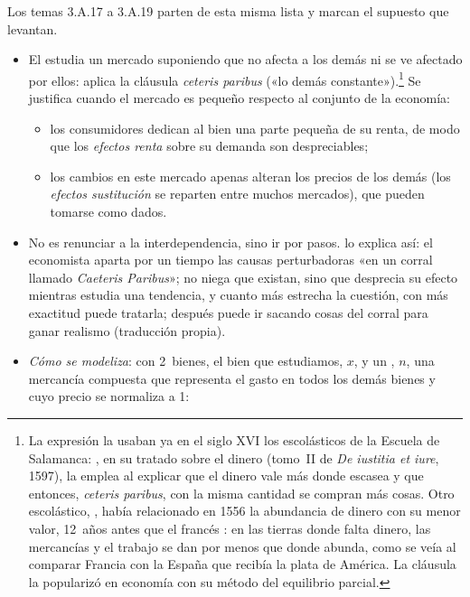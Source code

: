 \documentclass[11pt]{article}
\begin{document}
\begin{notaopositor}
Los temas 3.A.17 a 3.A.19 parten de esta misma lista y marcan el supuesto que levantan.
\end{notaopositor}

\begin{itemize}
\item El  estudia un mercado suponiendo que no afecta a los demás ni se ve afectado por ellos: aplica la cláusula \emph{ceteris paribus} («lo demás constante»).\footnote{La expresión la usaban ya en el siglo XVI los escolásticos de la Escuela de Salamanca: , en su tratado sobre el dinero (tomo~II de \emph{De iustitia et iure}, 1597), la emplea al explicar que el dinero vale más donde escasea y que entonces, \emph{ceteris paribus}, con la misma cantidad se compran más cosas\nocite{Molina1597Iustitia}. Otro escolástico, , había relacionado en 1556 la abundancia de dinero con su menor valor, 12~años antes que el francés \nocite{Azpilcueta1556Cambios,Bodin1568Reponse}: en las tierras donde falta dinero, las mercancías y el trabajo se dan por menos que donde abunda, como se veía al comparar Francia con la España que recibía la plata de América. La cláusula la popularizó en economía \textcite{Marshall1890Principles} con su método del equilibrio parcial.} Se justifica cuando el mercado es pequeño respecto al conjunto de la economía:
  \begin{itemize}
  \item los consumidores dedican al bien una parte pequeña de su renta, de modo que los \emph{efectos renta} sobre su demanda son despreciables;
  \item los cambios en este mercado apenas alteran los precios de los demás (los \emph{efectos sustitución} se reparten entre muchos mercados), que pueden tomarse como dados.
  \end{itemize}
\item No es renunciar a la interdependencia, sino ir por pasos. \textcite[libro~V, cap.~V, §~2]{Marshall1890Principles} lo explica así: el economista aparta por un tiempo las causas perturbadoras «en un corral llamado \emph{Caeteris Paribus}»; no niega que existan, sino que desprecia su efecto mientras estudia una tendencia, y cuanto más estrecha la cuestión, con más exactitud puede tratarla; después puede ir sacando cosas del corral para ganar realismo (traducción propia).
\item \emph{Cómo se modeliza}\nocite{MasColellWhinstonGreen1995}: con 2~bienes, el bien que estudiamos, $x$, y un , $n$, una mercancía compuesta que representa el gasto en todos los demás bienes y cuyo precio se normaliza a 1:

\end{itemize}
\end{document}
